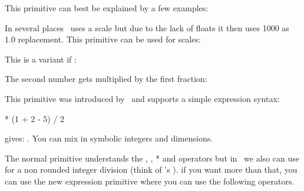 \stopoldprimitive

\startnewprimitive[title={\prm {numericscale}}]

This primitive can best be explained by a few examples:

\startbuffer
\the{}
\the{}
\the{}
\the{}
\stopbuffer

\typebuffer

In several places \TEX\ uses a scale but due to the lack of floats it then uses
1000 as 1.0 replacement. This primitive can be used for  scales:

\startlines \getbuffer \stoplines

\stopnewprimitive

\startnewprimitive[title={\prm {numericscaled}}]

This is a variant if :

\startbuffer
{}
\the{}   \scratchcounter
\the{} \scratchcounter
\the{}  \scratchcounter
\the{}  \scratchcounter
\stopbuffer

\typebuffer

The second number gets multiplied by the first fraction:

\startlines \getbuffer \stoplines

\stopnewprimitive


\startoldprimitive[title={\prm {numexpr}}]

This primitive was introduced by \ETEX\ and supports a simple expression syntax:

\startbuffer
\the{} * (1 + 2 - 5) / 2 \relax
\stopbuffer

\typebuffer

gives: \inlinebuffer. You can mix in symbolic integers and dimensions.

\stopoldprimitive

\startnewprimitive[title={\prm {numexpression}}]

The normal  primitive understands the \type {+}, \type {-}, \type
{*} and \type {/} operators but in \LUAMETATEX\ we also can use \type {:} for a
non rounded integer division (think of \LUA's \type {//}). if you want more than
that, you can use the new expression primitive where you can use the following
operators.

